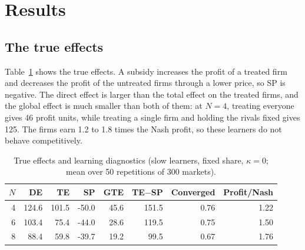 \documentclass[11pt]{article}
\begin{document}
\section{Results}
\subsection{The true effects}
Table~\ref{tab:truth} shows the true effects. A subsidy increases the profit of a treated firm and decreases the profit of the untreated firms through a lower price, so SP is negative. The direct effect is larger than the total effect on the treated firms, and the global effect is much smaller than both of them: at $N=4$, treating everyone gives 46 profit units, while treating a single firm and holding the rivals fixed gives 125. The firms earn 1.2 to 1.8 times the Nash profit, so these learners do not behave competitively.
\begin{table}[t]\centering\small\caption{True effects and learning diagnostics (slow learners, fixed share, $\kappa=0$; mean over 50 repetitions of 300 markets).}\label{tab:truth}
\begin{tabular}{rrrrrrrr}\toprule $N$ & DE & TE & SP & GTE & TE$-$SP & Converged & Profit/Nash\\\midrule
4 & 124.6 & 101.5 & -50.0 & 45.6 & 151.5 & 0.76 & 1.22\\
6 & 103.4 & 75.4 & -44.0 & 28.6 & 119.5 & 0.75 & 1.50\\
8 & 88.4 & 59.8 & -39.7 & 19.2 & 99.5 & 0.67 & 1.76\\
\bottomrule\end{tabular}\end{table}
\end{document}
